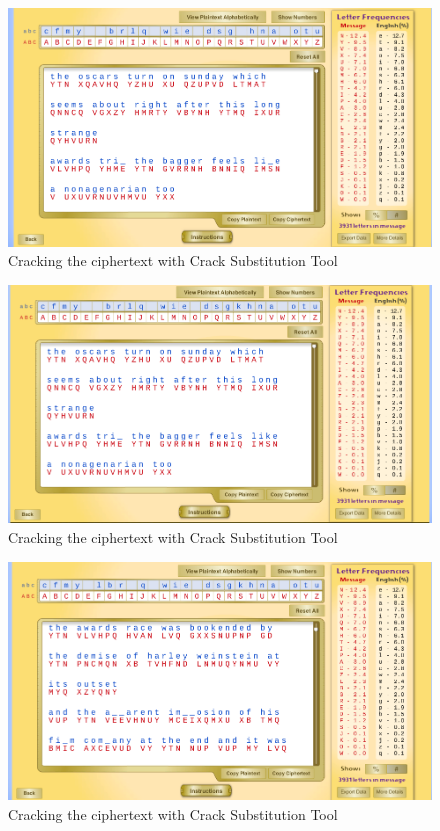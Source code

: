 \documentclass[12pt]{article}
\begin{document}
\begin{figure}[!ht]
    \begin{center}
        \includegraphics[scale=0.48]{c12.png}
    \end{center}{}
    \caption{Cracking the ciphertext with Crack Substitution Tool}
    \label{fig:c12}
\end{figure}

\begin{figure}[!ht]
    \begin{center}
        \includegraphics[scale=0.48]{c13.png}
    \end{center}{}
    \caption{Cracking the ciphertext with Crack Substitution Tool}
    \label{fig:c13}
\end{figure}

\begin{figure}[!ht]
    \begin{center}
        \includegraphics[scale=0.48]{c14.png}
    \end{center}{}
    \caption{Cracking the ciphertext with Crack Substitution Tool}
    \label{fig:c14}
\end{figure}
\end{document}
